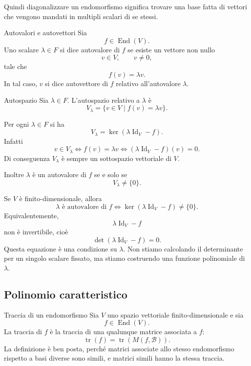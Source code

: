 \documentclass[a4paper]{article}
\begin{document}
Quindi diagonalizzare un endomorfismo significa trovare una base fatta di vettori che vengono mandati in multipli scalari di se stessi.

\begin{snippetdefinition}{Autovalori e autovettori}
    Sia
    \[
        f\in\operatorname{End}(V).
    \]
    Uno scalare \(\lambda\in F\) si dice autovalore di \(f\) se esiste un vettore non nullo
    \[
        v\in V,
        \qquad
        v\neq 0,
    \]
    tale che
    \[
        f(v)=\lambda v.
    \]
    In tal caso, \(v\) si dice autovettore di \(f\) relativo all'autovalore \(\lambda\).
\end{snippetdefinition}

\begin{snippetdefinition}{Autospazio}
    Sia \(\lambda\in F\). L'autospazio relativo a \(\lambda\) è
    \[
        V_\lambda
        =
        \{v\in V\mid f(v)=\lambda v\}.
    \]
\end{snippetdefinition}

\begin{snippetremark}{}
    Per ogni \(\lambda\in F\) si ha
    \[
        V_\lambda
        =
        \ker(\lambda\operatorname{Id}_V-f).
    \]
    Infatti
    \[
        v\in V_\lambda
        \Longleftrightarrow
        f(v)=\lambda v
        \Longleftrightarrow
        (\lambda\operatorname{Id}_V-f)(v)=0.
    \]
    Di conseguenza \(V_\lambda\) è sempre un sottospazio vettoriale di \(V\).

    Inoltre \(\lambda\) è un autovalore di \(f\) se e solo se
    \[
        V_\lambda\neq\{0\}.
    \]
\end{snippetremark}

Se \(V\) è finito-dimensionale, allora
\[
    \lambda \text{ è autovalore di } f
    \Longleftrightarrow
    \ker(\lambda\operatorname{Id}_V-f)\neq\{0\}.
\]
Equivalentemente,
\[
    \lambda\operatorname{Id}_V-f
\]
non è invertibile, cioè
\[
    \det(\lambda\operatorname{Id}_V-f)=0.
\]
Questa equazione è una condizione su \(\lambda\). Non stiamo calcolando il determinante per un singolo scalare fissato, ma stiamo costruendo una funzione polinomiale di \(\lambda\).

\subsection{Polinomio caratteristico}

\begin{snippetdefinition}{Traccia di un endomorfismo}
    Sia \(V\) uno spazio vettoriale finito-dimensionale e sia
    \[
        f\in\operatorname{End}(V).
    \]
    La traccia di \(f\) è la traccia di una qualunque matrice associata a \(f\):
    \[
        \operatorname{tr}(f)=\operatorname{tr}(M(f,\mathcal{B})).
    \]
    La definizione è ben posta, perché matrici associate allo stesso endomorfismo rispetto a basi diverse sono simili, e matrici simili hanno la stessa traccia.
\end{snippetdefinition}
\end{document}

